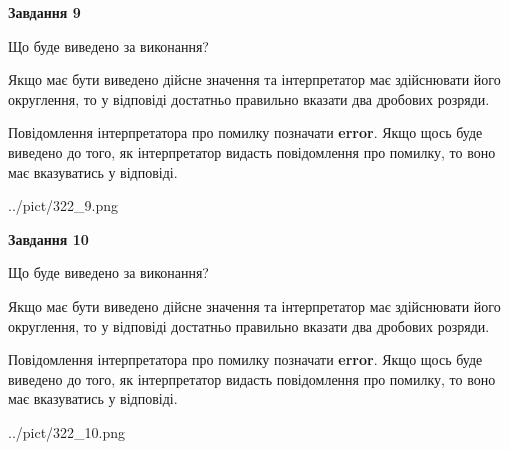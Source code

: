 \documentclass[12pt, ukrainian]{article}
\begin{document}
{\begin {Large}
{\begin {center}\textbf{Завдання 9}\end {center}}\par
Що буде виведено за виконання? \par

Якщо має бути виведено дійсне значення та інтерпретатор має здійснювати його округлення, 
то у відповіді достатньо правильно вказати два дробових розряди.

Повідомлення інтерпретатора про помилку позначати \textbf{error}.
Якщо щось буде виведено до того, як інтерпретатор видасть повідомлення про помилку, 
то воно має вказуватись у відповіді. \par

\begin{center}
	{../pict/322_9.png}
\end{center}
\newpage

{\begin {center}\textbf{Завдання 10}\end {center}}\par
Що буде виведено за виконання? \par

Якщо має бути виведено дійсне значення та інтерпретатор має здійснювати його округлення, 
то у відповіді достатньо правильно вказати два дробових розряди.

Повідомлення інтерпретатора про помилку позначати \textbf{error}.
Якщо щось буде виведено до того, як інтерпретатор видасть повідомлення про помилку, 
то воно має вказуватись у відповіді. \par

\begin{center}
	{../pict/322_10.png}
\end{center}
\newpage

\end {Large}}
\end{document}
